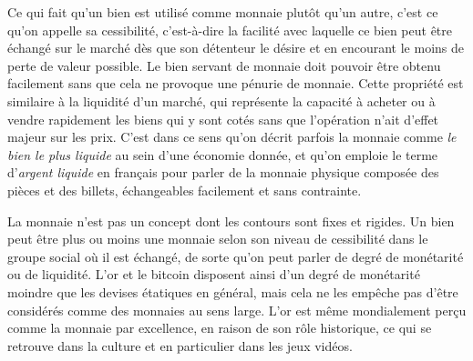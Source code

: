 Ce qui fait qu'un bien est utilisé comme monnaie plutôt qu'un autre, c'est ce qu'on appelle sa cessibilité, c'est-à-dire la facilité avec laquelle ce bien peut être échangé sur le marché dès que son détenteur le désire et en encourant le moins de perte de valeur possible. Le bien servant de monnaie doit pouvoir être obtenu facilement sans que cela ne provoque une pénurie de monnaie. Cette propriété est similaire à la liquidité d'un marché, qui représente la capacité à acheter ou à vendre rapidement les biens qui y sont cotés sans que l'opération n'ait d'effet majeur sur les prix. C'est dans ce sens qu'on décrit parfois la monnaie comme \emph{le bien le plus liquide} au sein d'une économie donnée, et qu'on emploie le terme d'\emph{argent liquide} en français pour parler de la monnaie physique composée des pièces et des billets, échangeables facilement et sans contrainte.

La monnaie n'est pas un concept dont les contours sont fixes et rigides. Un bien peut être plus ou moins une monnaie selon son niveau de cessibilité dans le groupe social où il est échangé, de sorte qu'on peut parler de degré de monétarité ou de liquidité. L'or et le bitcoin disposent ainsi d'un degré de monétarité moindre que les devises étatiques en général, mais cela ne les empêche pas d'être considérés comme des monnaies au sens large. L'or est même mondialement perçu comme la monnaie par excellence, en raison de son rôle historique, ce qui se retrouve dans la culture et en particulier dans les jeux vidéos. %

